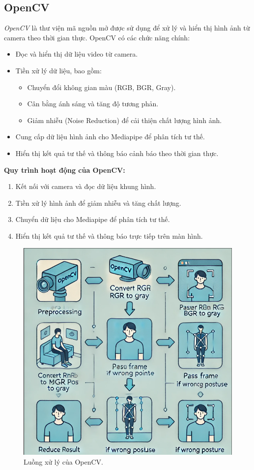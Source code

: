 \documentclass[conference]{IEEEtran}
\begin{document}
\subsection{OpenCV}
\textit{OpenCV} là thư viện mã nguồn mở được sử dụng để xử lý và hiển thị hình ảnh từ camera theo thời gian thực. OpenCV có các chức năng chính:
\begin{itemize}
    \item Đọc và hiển thị dữ liệu video từ camera.
    \item Tiền xử lý dữ liệu, bao gồm:
    \begin{itemize}
        \item Chuyển đổi không gian màu (RGB, BGR, Gray).
        \item Cân bằng ánh sáng và tăng độ tương phản.
        \item Giảm nhiễu (Noise Reduction) để cải thiện chất lượng hình ảnh.
    \end{itemize}
    \item Cung cấp dữ liệu hình ảnh cho Mediapipe để phân tích tư thế.
    \item Hiển thị kết quả tư thế và thông báo cảnh báo theo thời gian thực.
\end{itemize}

\textbf{Quy trình hoạt động của OpenCV:}
\begin{enumerate}
    \item Kết nối với camera và đọc dữ liệu khung hình.
    \item Tiền xử lý hình ảnh để giảm nhiễu và tăng chất lượng.
    \item Chuyển dữ liệu cho Mediapipe để phân tích tư thế.
    \item Hiển thị kết quả tư thế và thông báo trực tiếp trên màn hình.
\end{enumerate}

\begin{figure}[h]
    \centering
    \includegraphics[width=0.9\linewidth]{images/opencv_workflow.png}
    \caption{Luồng xử lý của OpenCV.}
    \label{fig:opencv_workflow}
\end{figure}
\end{document}
